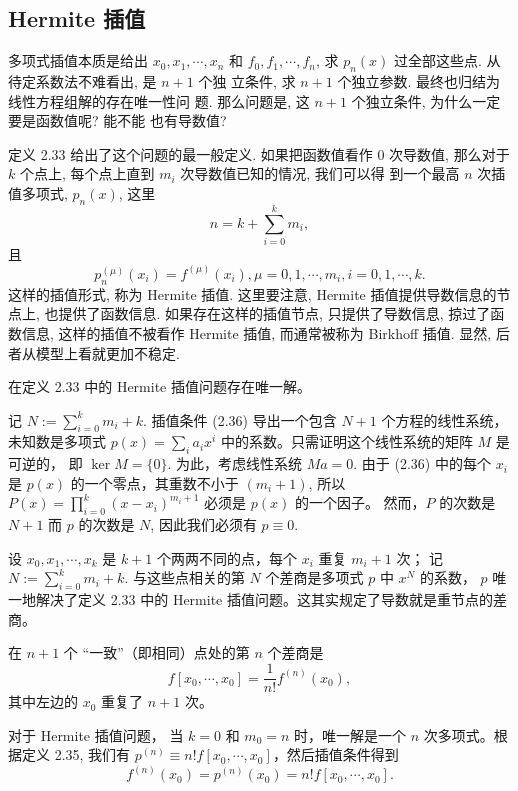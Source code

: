 \documentclass[a4paper]{ctexart}
\begin{document}
\subsection{Hermite 插值}

多项式插值本质是给出 $x_0, x_1, \cdots, x_n$ 和 $f_0, f_1, \cdots,
f_n$, 求 $p_n(x)$ 过全部这些点. 从待定系数法不难看出, 是 $n + 1$ 个独
立条件, 求 $n + 1$ 个独立参数. 最终也归结为线性方程组解的存在唯一性问
题. 那么问题是, 这 $n + 1$ 个独立条件, 为什么一定要是函数值呢? 能不能
也有导数值?

定义 2.33 给出了这个问题的最一般定义. 如果把函数值看作 $0$ 次导数值,
那么对于 $k$ 个点上, 每个点上直到 $m_i$ 次导数值已知的情况, 我们可以得
到一个最高 $n$ 次插值多项式, $p_n(x)$, 这里
$$
n = k + \sum_{i = 0}^k m_i,
$$
且
$$
p_n^{(\mu)}(x_i) = f^{(\mu)}(x_i), \mu = 0, 1, \cdots, m_i, i = 0, 1, \cdots, k.
$$
这样的插值形式, 称为 Hermite 插值. 这里要注意, Hermite 插值提供导数信息的节点上, 
也提供了函数信息. 如果存在这样的插值节点, 只提供了导数信息, 掠过了函数信息, 
这样的插值不被看作 Hermite 插值, 而通常被称为 Birkhoff 插值. 显然, 后者从模型上看就更加不稳定.

 在定义 2.33 中的 Hermite 插值问题存在唯一解。

 记 $N := \sum_{i=0}^k m_i + k$. 
插值条件 (2.36) 导出一个包含 $N + 1$ 个方程的线性系统，未知数是多项式 
$p(x) = \sum_{i} a_i x^i$ 中的系数。只需证明这个线性系统的矩阵 $M$ 是可逆的，
即 $\ker M = \{0\}$. 为此，考虑线性系统 $M a = 0$. 由于 (2.36) 中的每个 
$x_i$ 是 $p(x)$ 的一个零点，其重数不小于 $(m_i + 1)$, 
所以 $P(x) = \prod_{i=0}^k (x - x_i)^{m_i+1}$ 必须是 $p(x)$ 的一个因子。
然而，$P$ 的次数是 $N + 1$ 而 $p$ 的次数是 $N$, 因此我们必须有 $p \equiv 0$.

 设 $x_0 , x_1 , \cdots , x_k$ 
是 $k + 1$ 个两两不同的点，每个 $x_i$ 重复 $m_i + 1$ 次；
记 $N := \sum_{i=0}^k m_i + k$. 
与这些点相关的第 $N$ 个差商是多项式 $p$ 中 $x^N$ 的系数，
$p$ 唯一地解决了定义 2.33 中的 Hermite 插值问题。这其实规定了导数就是重节点的差商。

 在 $n + 1$ 个 ``一致''（即相同）点处的第 $n$ 
个差商是
\[
f [x_0 , \cdots , x_0] = \frac{1}{n!} f^{(n)} (x_0),
\]
其中左边的 $x_0$ 重复了 $n + 1$ 次。

 对于 Hermite 插值问题，
当 $k = 0$ 和 $m_0 = n$ 时，唯一解是一个 $n$ 次多项式。根据定义 2.35, 
我们有 $p^{(n)} \equiv n!f [x_0 , \cdots , x_0]$，然后插值条件得到
\[
f^{(n)} (x_0 ) = p^{(n)} (x_0 ) = n!f [x_0 , \cdots , x_0].
\]
\end{document}
